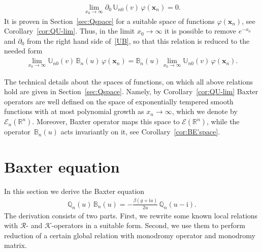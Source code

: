 \documentclass[11pt]{article}
\numberwithin{equation}{section}
\theoremstyle{plain}
\theoremstyle{definition}
\newcommand{\B}{\mathbb{B}}
\newcommand{\QQ}{\mathbb{Q}}
\newcommand{\MMO}{\mathbb{U}}
\renewcommand{\phi}{\varphi}
\renewcommand{\imath}{\mathrm{i}}
\begin{document}
\begin{align}
	\lim_{x_0 \to \infty}  \partial_0 \, \MMO_{n 0}(v) \, \phi(\bm{x}_n) = 0.
\end{align}
It is proven in Section~\ref{sec:Qspace} for a suitable space of functions $\phi(\bm{x}_n)$, see Corollary~\ref{cor:QU-lim}. Thus, in the limit $x_0\to \infty$ it is possible to remove $e^{-x_0}$ and $\partial_0$ from the right hand side of~\eqref{UB}, so that this relation is reduced to the needed form
\begin{align}
\lim_{x_0 \to \infty} \MMO_{n 0}(v) \, \B_n(u) \, 
\phi(\bm{x}_n)  = \B_n(u)\, \lim_{x_0 \to \infty} \MMO_{n 0}(v)\,\phi(\bm{x}_n).
\end{align}

The technical details about the spaces of functions, on which all above relations hold are given in Section~\ref{sec:Qspace}. Namely, by Corollary~\ref{cor:QU-lim} Baxter operators are well defined on the space of exponentially tempered smooth functions with at most polynomial growth as $x_n \to \infty$, which we denote by $\mathcal{E}_n(\mathbb{R}^n)$. Moreover, Baxter operator maps this space to $\mathcal{E}(\mathbb{R}^n)$, while the operator~$\B_n(u)$ acts invariantly on it, see Corollary~\ref{cor:BE'space}.

\section{Baxter equation} \label{sec:bax-eq}
In this section we derive the Baxter equation
\begin{align} \label{Bax-eq}
	\QQ_n(u)\,\B_n(u)  = - \frac{\beta (g + \imath u)}{2u} \,\QQ_n(u-\imath).
\end{align}
The derivation consists of two parts. First, we rewrite some known local relations with $\mathcal{R}$- and $\mathcal{K}$-operators in a suitable form. Second, we use them to perform reduction of a certain global relation with monodromy operator and monodromy matrix. 
\end{document}
